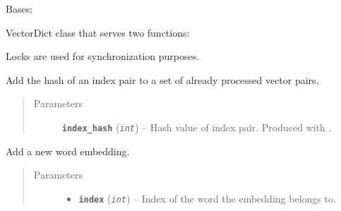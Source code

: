 \documentclass[letterpaper,10pt,english]{sphinxmanual}
\begin{document}
\begin{fulllineitems}
\label{src.mapping:src.mapping.mapthreading.VectorDict}
Bases: 
\begin{description}
\item[{VectorDict class that serves two functions:}] \leavevmode
{}

\end{description}

Locks are used for synchronization purposes.

\begin{fulllineitems}
\label{src.mapping:src.mapping.mapthreading.VectorDict.add_skippable}
Add the hash of an index pair to a set of already processed vector pairs.
\begin{quote}\begin{description}
\item[{Parameters}] \leavevmode
\textbf{\texttt{index\_hash}} (\emph{\texttt{int}}) -- Hash value of index pair. Produced with .

\end{description}\end{quote}

\end{fulllineitems}


\begin{fulllineitems}
\label{src.mapping:src.mapping.mapthreading.VectorDict.add_vector}
Add a new word embedding.
\begin{quote}\begin{description}
\item[{Parameters}] \leavevmode\begin{itemize}
\item {} 
\textbf{\texttt{index}} (\emph{\texttt{int}}) -- Index of the word the embedding belongs to.


\end{itemize}
\end{description}
\end{quote}
\end{fulllineitems}
\end{fulllineitems}
\end{document}
